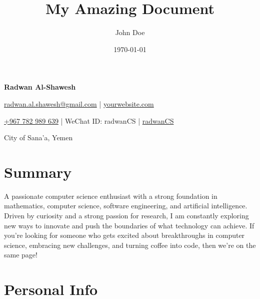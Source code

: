 \documentclass[a4paper,11pt]{article}
\title{My Amazing Document}
\author{John Doe}
\date{\today}  %
\newcommand{\socialicon}[1]{\raisebox{-0.05em}{\resizebox{!}{1em}{#1}}}
\newcommand{\headerfontiii}{\fontfamily{ppl}\selectfont} %
\begin{document}
	\headerfontiii
	
	\begin{center}
		{\Huge\textbf{Radwan Al-Shawesh}}
	\end{center}
	\vspace{-6mm}
	
	\begin{center}
		\small{
			\href{mailto:radwan.al.shawesh@gmail.com}{radwan.al.shawesh@gmail.com} | 
			\href{https://www.yourwebsite.com/}{yourwebsite.com}
		}
	\end{center}
	\vspace{-6mm}
	
	\begin{center}
		\small{
			\socialicon{\faWhatsappSquare} \href{https://wa.me/967782989639}{+967 782 989 639} |
			\socialicon{\faWeixin} WeChat ID: radwanCS |
			\socialicon{\faGithub} \href{https://github.com/radwanCS}{radwanCS}
		}
	\end{center}
	\vspace{-6mm}
	
	\begin{center}
		\small{City of Sana'a, Yemen}
	\end{center}
	\vspace{-4mm}
	
	\section{\textbf{Summary}}
	\vspace{1mm}
	\small{
		A passionate computer science enthusiast with a strong foundation in mathematics, computer science, software engineering, and 
		artificial intelligence. Driven by curiosity and a strong passion for research, I am constantly exploring new ways to innovate 
		and push the boundaries of what technology can achieve. If you're looking for someone who gets excited about breakthroughs in computer science, 
		embracing new challenges, and turning coffee into code, then we’re on the same page!
	}
	\vspace{-2mm}
	
	\section{\textbf{Personal Info}}
	\vspace{-2mm}

\end{document}
